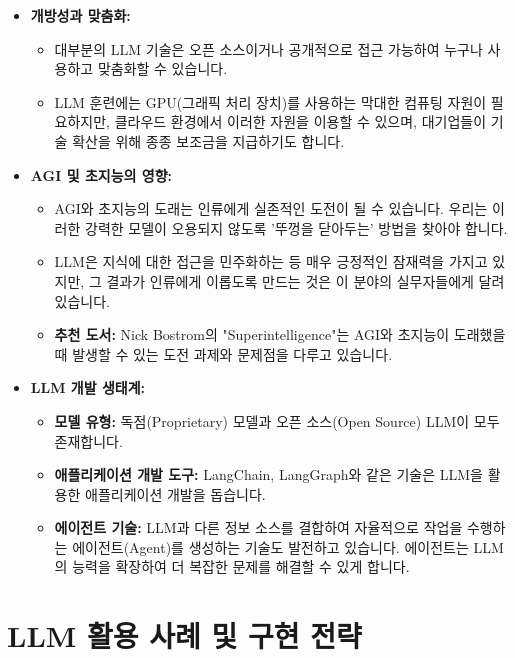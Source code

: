\documentclass[11pt,a4paper]{article}
\begin{document}
\begin{itemize}
    \item \textbf{개방성과 맞춤화:}
    \begin{itemize}
        \item 대부분의 LLM 기술은 오픈 소스이거나 공개적으로 접근 가능하여 누구나 사용하고 맞춤화할 수 있습니다.
        \item LLM 훈련에는 GPU(그래픽 처리 장치)를 사용하는 막대한 컴퓨팅 자원이 필요하지만, 클라우드 환경에서 이러한 자원을 이용할 수 있으며, 대기업들이 기술 확산을 위해 종종 보조금을 지급하기도 합니다.
    \end{itemize}

    \item \textbf{AGI 및 초지능의 영향:}
    \begin{itemize}
        \item AGI와 초지능의 도래는 인류에게 실존적인 도전이 될 수 있습니다. 우리는 이러한 강력한 모델이 오용되지 않도록 '뚜껑을 닫아두는' 방법을 찾아야 합니다.
        \item LLM은 지식에 대한 접근을 민주화하는 등 매우 긍정적인 잠재력을 가지고 있지만, 그 결과가 인류에게 이롭도록 만드는 것은 이 분야의 실무자들에게 달려 있습니다.
        \item \textbf{추천 도서:} Nick Bostrom의 "Superintelligence"는 AGI와 초지능이 도래했을 때 발생할 수 있는 도전 과제와 문제점을 다루고 있습니다.
    \end{itemize}

    \item \textbf{LLM 개발 생태계:}
    \begin{itemize}
        \item \textbf{모델 유형:} 독점(Proprietary) 모델과 오픈 소스(Open Source) LLM이 모두 존재합니다.
        \item \textbf{애플리케이션 개발 도구:} LangChain, LangGraph와 같은 기술은 LLM을 활용한 애플리케이션 개발을 돕습니다.
        \item \textbf{에이전트 기술:} LLM과 다른 정보 소스를 결합하여 자율적으로 작업을 수행하는 에이전트(Agent)를 생성하는 기술도 발전하고 있습니다. 에이전트는 LLM의 능력을 확장하여 더 복잡한 문제를 해결할 수 있게 합니다.
    \end{itemize}
\end{itemize}

\newpage
\section{LLM 활용 사례 및 구현 전략}
\end{document}
